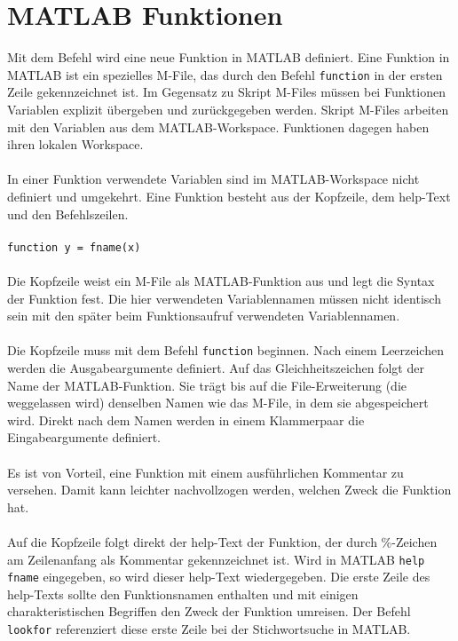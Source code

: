\section{MATLAB Funktionen} 
Mit dem Befehl  wird eine neue Funktion in MATLAB definiert. Eine Funktion in MATLAB ist ein spezielles M-File, das durch den Befehl \texttt{function} in der ersten Zeile gekennzeichnet ist. Im Gegensatz zu Skript M-Files müssen bei Funktionen Variablen explizit übergeben und zurückgegeben werden. Skript M-Files arbeiten mit den Variablen aus dem MATLAB-Workspace. Funktionen dagegen haben ihren lokalen Workspace. 
\\\\
In einer Funktion verwendete Variablen sind im MATLAB-Workspace nicht definiert und umgekehrt. Eine Funktion besteht aus der Kopfzeile, dem help-Text und den Befehlszeilen.
\\\\
{\color{red}\texttt{function y = fname(x)}} 
\\\\
Die Kopfzeile weist ein M-File als MATLAB-Funktion aus und legt die Syntax der Funktion fest. Die hier verwendeten Variablennamen müssen nicht identisch sein mit den später beim Funktionsaufruf verwendeten Variablennamen.
\\\\
Die Kopfzeile muss mit dem Befehl {\color{red}\texttt{function}} beginnen. Nach einem Leerzeichen werden die Ausgabeargumente definiert. Auf das Gleichheitszeichen folgt der Name der MATLAB-Funktion. Sie trägt bis auf die File-Erweiterung  (die weggelassen wird) denselben Namen wie das M-File, in dem sie abgespeichert wird. Direkt nach dem Namen werden in einem Klammerpaar die Eingabeargumente definiert.
\\\\
Es ist von Vorteil, eine Funktion mit einem ausführlichen Kommentar zu versehen. Damit kann leichter nachvollzogen werden, welchen Zweck die Funktion hat.
\\\\
Auf die Kopfzeile folgt direkt der help-Text der Funktion, der durch \%-Zeichen am Zeilenanfang als Kommentar gekennzeichnet ist. Wird in MATLAB \texttt{help fname} eingegeben, so wird dieser help-Text wiedergegeben. Die erste Zeile des help-Texts sollte den Funktionsnamen enthalten und mit einigen charakteristischen Begriffen den Zweck der Funktion umreisen. Der Befehl {\color{red}\texttt{lookfor}} referenziert diese erste Zeile bei der Stichwortsuche in MATLAB.
